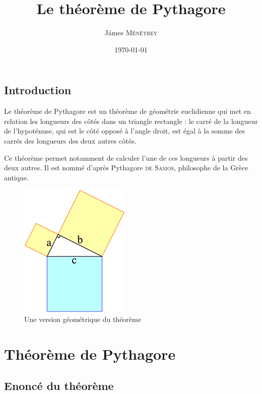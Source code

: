 \documentclass{book}
\title{Le théorème de Pythagore}
\author{Jämes \textsc{Ménétrey}}
\date{\today}
\begin{document}
\renewcommand{\contentsname}{Sommaire}

\maketitle

\frontmatter

\tableofcontents

\chapter{Introduction}

Le théorème de Pythagore est un théorème de géométrie euclidienne qui met en relation les longueurs des côtés dans un triangle rectangle : le carré de la longueur de l’hypoténuse, qui est le côté opposé à l'angle droit, est égal à la somme des carrés des longueurs des deux autres côtés.

Ce théorème permet notamment de calculer l’une de ces longueurs à partir des deux autres. Il est nommé d’après Pythagore \textsc{de Samos}, philosophe de la Grèce antique.

\begin{figure}[h]
\begin{center}
\includegraphics{img/intro.png}
\end{center}
\caption{Une version géométrique du théorème}
\label{Une version géométrique du théorème}
\end{figure}

\mainmatter

\part{Théorème de Pythagore}

\chapter{Enoncé du théorème}
\end{document}
